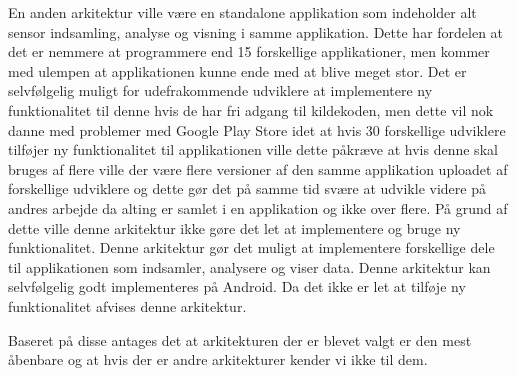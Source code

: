 En anden arkitektur ville være en standalone applikation som indeholder alt sensor indsamling, analyse og visning i samme applikation.
Dette har fordelen at det er nemmere at programmere end 15 forskellige applikationer, men kommer med ulempen at applikationen kunne ende med at blive meget stor.
Det er selvfølgelig muligt for udefrakommende udviklere at implementere ny funktionalitet til denne hvis de har fri adgang til kildekoden, men dette vil nok danne med problemer med Google Play Store idet at hvis 30 forskellige udviklere tilføjer ny funktionalitet til applikationen ville dette påkræve at hvis denne skal bruges af flere ville der være flere versioner af den samme applikation uploadet af forskellige udviklere og dette gør det på samme tid svære at udvikle videre på andres arbejde da alting er samlet i en applikation og ikke over flere.
På grund af dette ville denne arkitektur ikke gøre det let at implementere og bruge ny funktionalitet.
Denne arkitektur gør det muligt at implementere forskellige dele til applikationen som indsamler, analysere og viser data.
Denne arkitektur kan selvfølgelig godt implementeres på Android.
Da det ikke er let at tilføje ny funktionalitet afvises denne arkitektur. 

Baseret på disse antages det at arkitekturen der er blevet valgt er den mest åbenbare og at hvis der er andre arkitekturer kender vi ikke til dem.